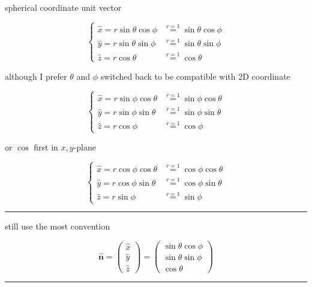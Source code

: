 \documentclass[
]{book}
\theoremstyle{definition}
\theoremstyle{definition}
\theoremstyle{definition}
\theoremstyle{definition}
\theoremstyle{remark}
\begin{document}
spherical coordinate unit vector

\[
\begin{cases}
\hat{x}=r\sin\theta\cos\phi & \overset{r=1}{=}\sin\theta\cos\phi\\
\hat{y}=r\sin\theta\sin\phi & \overset{r=1}{=}\sin\theta\sin\phi\\
\hat{z}=r\cos\theta & \overset{r=1}{=}\cos\theta
\end{cases}
\]

although I prefer \(\theta\) and \(\phi\) switched back to be compatible with 2D coordinate

\[
\begin{cases}
\hat{x}=r\sin\phi\cos\theta & \overset{r=1}{=}\sin\phi\cos\theta\\
\hat{y}=r\sin\phi\sin\theta & \overset{r=1}{=}\sin\phi\sin\theta\\
\hat{z}=r\cos\phi & \overset{r=1}{=}\cos\phi
\end{cases}
\]

or \(\cos\) first in \(x,y\)-plane

\[
\begin{cases}
\hat{x}=r\cos\phi\cos\theta & \overset{r=1}{=}\cos\phi\cos\theta\\
\hat{y}=r\cos\phi\sin\theta & \overset{r=1}{=}\cos\phi\sin\theta\\
\hat{z}=r\sin\phi & \overset{r=1}{=}\sin\phi
\end{cases}
\]

\begin{center}\rule{0.5\linewidth}{0.5pt}\end{center}

still use the most convention

\[
\hat{\boldsymbol{n}}=\begin{pmatrix}\hat{x}\\
\hat{y}\\
\hat{z}
\end{pmatrix}=\begin{pmatrix}\sin\theta\cos\phi\\
\sin\theta\sin\phi\\
\cos\theta
\end{pmatrix}
\]

\begin{center}\rule{0.5\linewidth}{0.5pt}\end{center}
\end{document}
